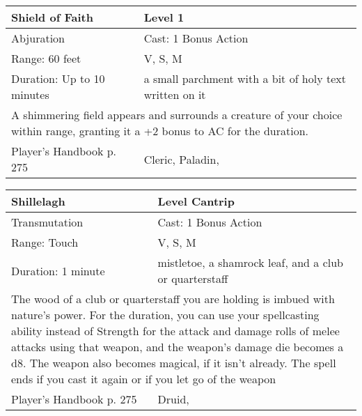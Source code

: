 \documentclass[11pt]{report}
\begin{document}
\begin{table}[H]
	\begin{tabular}{||p{6cm}|p{6cm}||}
		\hline\hline
		\bf{Shield of Faith} & Level 1\\ \hline
		Abjuration & Cast: 1 Bonus Action\\ \hline
		Range: 60 feet & V, S, M\\ \hline
		Duration: Up to 10 minutes & a small parchment with a bit of holy text written on it\\ \hline
		\multicolumn{2}{||p{12cm}||}{A shimmering field appears and surrounds a creature of your choice within range, granting it a +2 bonus to AC for the duration.}\\ \hline
Player's Handbook p. 275 & Cleric, Paladin, \\ \hline\hline
	\end{tabular}
\end{table}

\begin{table}[H]
	\begin{tabular}{||p{6cm}|p{6cm}||}
		\hline\hline
		\bf{Shillelagh} & Level Cantrip\\ \hline
		Transmutation & Cast: 1 Bonus Action\\ \hline
		Range: Touch & V, S, M\\ \hline
		Duration: 1 minute & mistletoe, a shamrock leaf, and a club or quarterstaff\\ \hline
		\multicolumn{2}{||p{12cm}||}{The wood of a club or quarterstaff you are holding is imbued with nature’s power.
For the duration, you can use your spellcasting ability instead of Strength for the attack and damage rolls of melee attacks using that weapon, and the weapon’s damage die becomes a d8. The weapon also becomes magical, if it isn’t already. The spell ends if you cast it again or if you let go of the weapon}\\ \hline
Player's Handbook p. 275 & Druid, \\ \hline\hline
	\end{tabular}
\end{table}
\end{document}
